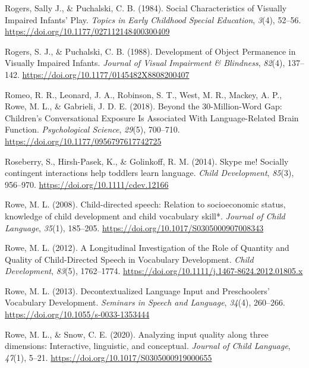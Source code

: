 \documentclass[
  man]{apa6}
\newlength{\cslhangindent}
\newlength{\cslentryspacingunit} %
\newenvironment{CSLReferences}[2] %
 {%
  \setlength{\parindent}{0pt}
  \ifodd #1
  \let\oldpar\par
  \def\par{\hangindent=\cslhangindent\oldpar}
  \fi
  \setlength{\parskip}{#2\cslentryspacingunit}
 }%
 {}
\begin{document}
\begin{CSLReferences}{1}{0}
\leavevmode{}%
Rogers, Sally J., \& Puchalski, C. B. (1984). Social {Characteristics} of {Visually} {Impaired} {Infants}' {Play}. \emph{Topics in Early Childhood Special Education}, \emph{3}(4), 52--56. \url{https://doi.org/10.1177/027112148400300409}

\leavevmode{}%
Rogers, S. J., \& Puchalski, C. B. (1988). Development of {Object} {Permanence} in {Visually} {Impaired} {Infants}. \emph{Journal of Visual Impairment \& Blindness}, \emph{82}(4), 137--142. \url{https://doi.org/10.1177/0145482X8808200407}

\leavevmode{}%
Romeo, R. R., Leonard, J. A., Robinson, S. T., West, M. R., Mackey, A. P., Rowe, M. L., \& Gabrieli, J. D. E. (2018). Beyond the 30-{Million}-{Word} {Gap}: {Children}'s {Conversational} {Exposure} {Is} {Associated} {With} {Language}-{Related} {Brain} {Function}. \emph{Psychological Science}, \emph{29}(5), 700--710. \url{https://doi.org/10.1177/0956797617742725}

\leavevmode{}%
Roseberry, S., Hirsh-Pasek, K., \& Golinkoff, R. M. (2014). Skype me! {Socially} contingent interactions help toddlers learn language. \emph{Child Development}, \emph{85}(3), 956--970. \url{https://doi.org/10.1111/cdev.12166}

\leavevmode{}%
Rowe, M. L. (2008). Child-directed speech: Relation to socioeconomic status, knowledge of child development and child vocabulary skill*. \emph{Journal of Child Language}, \emph{35}(1), 185--205. \url{https://doi.org/10.1017/S0305000907008343}

\leavevmode{}%
Rowe, M. L. (2012). A {Longitudinal} {Investigation} of the {Role} of {Quantity} and {Quality} of {Child}-{Directed} {Speech} in {Vocabulary} {Development}. \emph{Child Development}, \emph{83}(5), 1762--1774. \url{https://doi.org/10.1111/j.1467-8624.2012.01805.x}

\leavevmode{}%
Rowe, M. L. (2013). Decontextualized {Language} {Input} and {Preschoolers}' {Vocabulary} {Development}. \emph{Seminars in Speech and Language}, \emph{34}(4), 260--266. \url{https://doi.org/10.1055/s-0033-1353444}

\leavevmode{}%
Rowe, M. L., \& Snow, C. E. (2020). Analyzing input quality along three dimensions: Interactive, linguistic, and conceptual. \emph{Journal of Child Language}, \emph{47}(1), 5--21. \url{https://doi.org/10.1017/S0305000919000655}


\end{CSLReferences}
\end{document}
